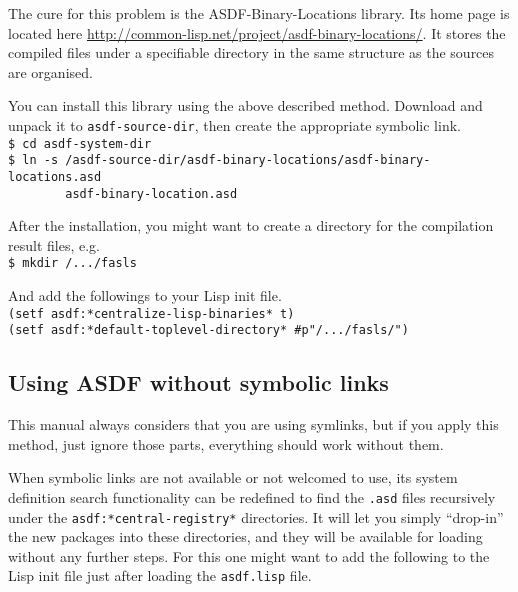 \documentclass[11pt,a4paper,dvipdfm]{article}
\newcommand{\selfref}[1]{\href{#1}{#1}}
\newcommand{\prompttext}[1]{\texttt{#1}}
\newcommand{\shprompt}[1]{\prompttext{\$ #1}}
\begin{document}
The cure for this problem is the ASDF-Binary-Locations library. Its home
page is located here
\selfref{http://common-lisp.net/project/asdf-binary-locations/}. It stores
the compiled files under a specifiable directory in the same structure as
the sources are organised.

You can install this library using the above described method. Download and
unpack it to \prompttext{asdf-source-dir}, then create the appropriate
symbolic link. \\
\shprompt{cd asdf-system-dir} \\
\shprompt{ln -s
/asdf-source-dir/asdf-binary-locations/asdf-binary-locations.asd \\
\mbox{~~~~~~~~}asdf-binary-location.asd}

After the installation, you might want to create a directory for the
compilation result files, e.g. \\
\shprompt{mkdir /.../fasls}

And add the followings to your Lisp init file. \\
\prompttext{(setf asdf:*centralize-lisp-binaries* t)} \\
\prompttext{(setf asdf:*default-toplevel-directory* \#p"/.../fasls/")}

\hypertarget{nosymlink}{\subsection{Using ASDF without symbolic links}}

This manual always considers that you are using symlinks, but if you apply
this method, just ignore those parts, everything should work without them.

When symbolic links are not available or not welcomed to use, its system
definition search functionality can be redefined to find the \prompttext{.asd}
files recursively under the \prompttext{asdf:*central-registry*} directories.
It will let you simply ``drop-in'' the new packages into these directories,
and they will be available for loading without any further steps. For this
one might want to add the following to the Lisp init file just after loading
the \prompttext{asdf.lisp} file.
\end{document}

